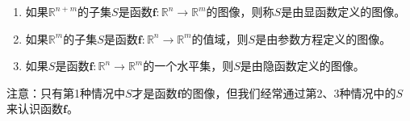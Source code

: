 \documentclass[main.tex]{subfiles}
\begin{document}
\begin{enumerate}
\item 如果$\mathbb{R}^{n+m}$的子集$S$是函数$\mathbf{f}:\mathbb{R}^n\rightarrow\mathbb{R}^m$的图像，则称$S$是由显函数定义的图像。
\item 如果$\mathbb{R}^{m}$的子集$S$是函数$\mathbf{f}:\mathbb{R}^n\rightarrow\mathbb{R}^m$的值域，则$S$是由参数方程定义的图像。
\item 如果$S$是函数$\mathbf{f}:\mathbb{R}^n\rightarrow\mathbb{R}^m$的一个水平集，则$S$是由隐函数定义的图像。
\end{enumerate}

注意：只有第1种情况中$S$才是函数$\mathbf{f}$的图像，但我们经常通过第2、3种情况中的$S$来认识函数$\mathbf{f}$。
\end{document}
